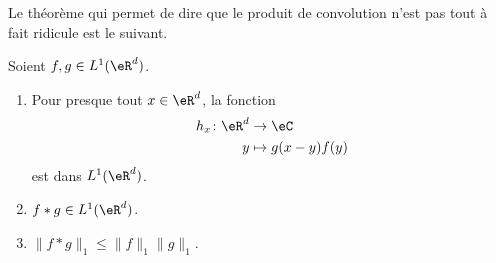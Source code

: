 Le théorème qui permet de dire que le produit de convolution n'est pas tout à fait ridicule est le suivant.

\begin{theorem}     \label{THOooMLNMooQfksn}
	Soient \( f,g\in L^1(\eR^d)\).
	\begin{enumerate}
		\item
		      Pour presque tout \( x\in \eR^d\), la fonction
		      \begin{equation}
			      \begin{aligned}
				      h_x\colon \eR^d & \to \eC            \\
				      y               & \mapsto g(x-y)f(y)
			      \end{aligned}
		      \end{equation}
		      est dans \( L^1(\eR^d)\).
		\item
		      \( f*g\in L^1(\eR^d)\).
		\item
		      \( \| f*g \|_1\leq \| f \|_1\| g \|_1\).
	\end{enumerate}
\end{theorem}


